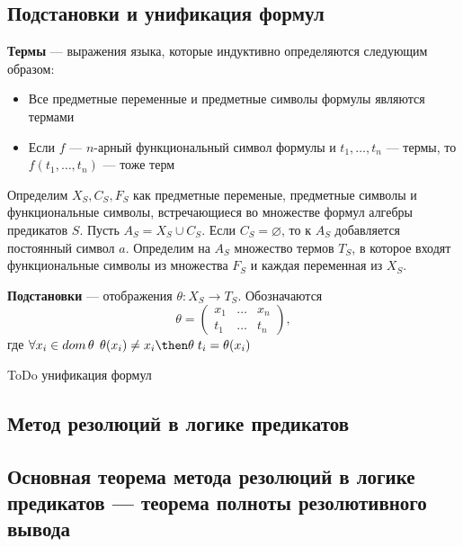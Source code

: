 \subsection{Подстановки и унификация формул}
\dftion \textbf{Термы} --- выражения языка, которые индуктивно определяются следующим образом:
\begin{itemize}
    \item Все предметные переменные и предметные символы формулы являются термами
    \item Если $f$ --- $n$-арный функциональный символ формулы и $t_1, \dots, t_n$ --- термы, то $f(t_1,\dots,t_n)$ --- тоже терм
\end{itemize}
Определим $X_S, C_S, F_S$ как предметные переменые, предметные символы и функциональные символы, встречающиеся во множестве формул алгебры предикатов $S$. Пусть $A_S = X_S \cup C_S$. Если $C_S = \varnothing$, то к $A_S$ добавляется постоянный символ $a$. Определим на $A_S$ множество термов $T_S$, в которое входят функциональные символы из множества $F_S$ и каждая переменная из $X_S$.

\dftion \textbf{Подстановки} --- отображения $\theta: X_S \to T_S$. Обозначаются
$$\theta = \left(
\begin{matrix}
    x_1 & \dots & x_n \\
    t_1 & \dots & t_n
\end{matrix}
\right),$$
где $\forall x_i \in dom \, \theta \; \,  \theta(x_i) \neq x_i \then \theta \; t_i=\theta(x_i)$

ToDo унификация формул
\subsection{Метод резолюций в логике предикатов}
\subsection{Основная теорема метода резолюций в логике предикатов --- теорема полноты резолютивного вывода}